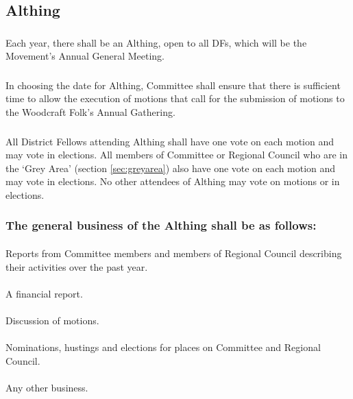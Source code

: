 \documentclass[a4paper, 12pt]{article}
\begin{document}
\subsection{Althing}
\label{sec:althing}
\subsubsection{}
Each year, there shall be an Althing, open to all DFs, which will be the Movement's Annual General Meeting.
\subsubsection{}
In choosing the date for Althing, Committee shall ensure that there is sufficient time to allow the execution of motions that call for the submission of motions to the Woodcraft Folk's Annual Gathering.
\subsubsection{}
All District Fellows attending Althing shall have one vote on each motion and may vote in elections. All members of Committee or Regional Council who are in the `Grey Area' (section \ref{sec:greyarea}) also have one vote on each motion and may vote in elections. No other attendees of Althing may vote on motions or in elections.
\subsubsection{The general business of the Althing shall be as follows:}
\paragraph{}
Reports from Committee members and members of Regional Council describing their activities over the past year.
\paragraph{}
A financial report.
\paragraph{}
Discussion of motions.
\paragraph{}
Nominations, hustings and elections for places on Committee and Regional Council.
\paragraph{}
Any other business.
\end{document}
